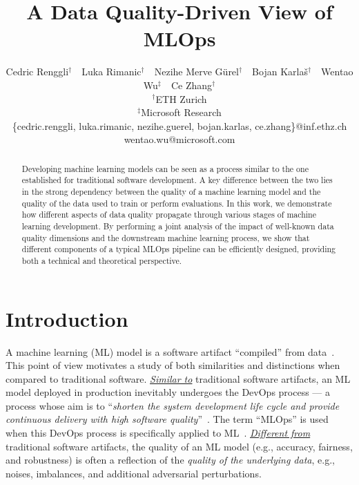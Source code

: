 \documentclass[11pt]{article}
\begin{document}
\title{A Data Quality-Driven View of MLOps}
\author{Cedric Renggli$^\dagger$~~Luka Rimanic$^\dagger$~~Nezihe Merve Gürel$^\dagger$~~Bojan Karla\v{s}$^\dagger$~~Wentao Wu$^\ddagger$~~Ce Zhang$^\dagger$\\
$^\dagger$ETH Zurich\\
$^\ddagger$Microsoft Research\\
\{cedric.renggli, luka.rimanic, nezihe.guerel, bojan.karlas, ce.zhang\}@inf.ethz.ch\\
wentao.wu@microsoft.com
}

\maketitle

\begin{abstract}
Developing machine learning models can be seen as 
a process similar to the one established for 
traditional software development.
A key difference between the two lies in the 
strong dependency between the quality of a machine learning model
and the quality of the data used to train or perform evaluations.
In this work, we demonstrate how different aspects
of data quality propagate through various stages
of machine learning development.
By performing a joint analysis of the impact 
of well-known data quality dimensions and 
the downstream machine learning process, we show that different components
of a typical MLOps pipeline can be
efficiently designed, providing both a technical and theoretical 
perspective.
\end{abstract}

\section{Introduction}

A machine learning (ML) model 
is a software artifact ``compiled'' from data~\cite{karpathy2017software2}. 
This point of view motivates a study of both similarities
and distinctions when compared to 
traditional software.
\textit{\underline{Similar to}} traditional software artifacts,
an ML model deployed in production 
inevitably undergoes the DevOps process ---
a process whose aim is to
``\textit{shorten the system development life cycle
and provide continuous delivery with 
high software quality}''~\cite{bass2015devops}.
The term ``MLOps'' is used
when this DevOps process is specifically applied to ML~\cite{alla2021mlops}.
\textit{\underline{Different from}}
traditional software artifacts,
the quality of an ML model 
(e.g., accuracy, fairness, and robustness) is often 
a reflection of the
\textit{quality of the underlying data}, 
e.g., noises, imbalances, and additional adversarial perturbations.
\end{document}
